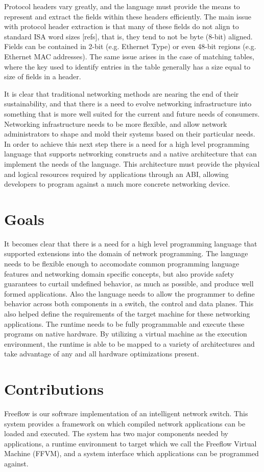Protocol headers vary greatly, and the language must provide the means to 
represent and extract the fields within these headers efficiently. The main 
issue with protocol header extraction is that many of these fields do not 
align to standard ISA word sizes [refs], that is, they tend to not be byte 
(8-bit) aligned. Fields can be contained in 2-bit (e.g. Ethernet Type) or even 
48-bit regions (e.g. Ethernet MAC addresses). The same issue arises in the case
of matching tables, where the key used to identify entries in the table 
generally has a size equal to size of fields in a header.

It is clear that traditional networking methods are nearing the end of their
sustainability, and that there is a need to evolve networking infrastructure
into something that is more well suited for the current and future needs of
consumers. Networking infrastructure needs to be more flexible, and allow 
network administrators to shape and mold their systems based on their
particular needs. In order to achieve this next step there is a need for a
high level programming language that supports networking constructs and
a native architecture that can implement the needs of the language. This
architecture must provide the physical and logical resources required by
applications through an ABI, allowing developers to program against a much
more concrete networking device.

\section{Goals}
It becomes clear that there is a need for a high level programming language 
that supported extensions into the domain of network programming. The language 
needs to be flexible enough to accomodate common programming language features 
and networking domain specific concepts, but also provide safety guarantees to 
curtail undefined behavior, as much as possible, and produce well formed 
applications. Also the language needs to allow the programmer to define 
behavior across both components in a switch, the control and data planes. This 
also helped define the requirements of the target machine for these networking 
applications. The runtime needs to be fully programmable and execute these 
programs on native hardware. By utilizing a virtual machine as the execution 
environment, the runtime is able to be mapped to a variety of architectures 
and take advantage of any and all hardware optimizations present.

\section{Contributions}
Freeflow is our software implementation of an intelligent network switch. This 
system provides a framework on which compiled network applications can be 
loaded and executed. The system has two major components needed by 
applications, a runtime environment to target which we call the Freeflow 
Virtual Machine (FFVM), and a system interface which applications can be 
programmed against. 

